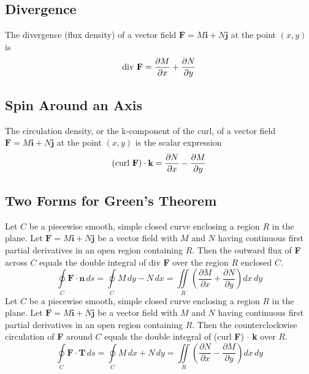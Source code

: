 \documentclass{article}
\begin{document}
\subsection*{Divergence}
The divergence (flux density) of a vector field \(\textbf{F}=M\textbf{i}+N\textbf{j}\) at the point \((x,y)\) is
\[\textnormal{div }\textbf{F}=\frac{\partial M}{\partial x}+\frac{\partial N}{\partial y}\]
\subsection*{Spin Around an Axis}
The circulation density, or the k-component of the curl, of a vector field \(\textbf{F}=M\textbf{i}+N\textbf{j}\) at the point \((x,y)\) is the scalar expression
\[(\textnormal{curl }\textbf{F})\cdot \textbf{k}=\frac{\partial N}{\partial x}-\frac{\partial M}{\partial y}\]
\subsection*{Two Forms for Green's Theorem}
Let \(C\) be a piecewise smooth, simple closed curve enclosing a region \(R\) in the plane. Let \(\textbf{F}=M\textbf{i}+N\textbf{j}\) be a vector field with \(M\) and \(N\) having continuous first partial derivatives in an open region containing \(R\). Then the outward flux of \textbf{F} across \(C\) equals the double integral of div \textbf{F} over the region \(R\) enclosed \(C\).
\[\oint\limits_C\textbf{F}\cdot\textbf{n}\,ds=\oint\limits_CM\,dy-N\,dx=\iint\limits_R\left(\frac{\partial M}{\partial x}+\frac{\partial N}{\partial y}\right)dx\,dy\]
Let \(C\) be a piecewise smooth, simple closed curve enclosing a region \(R\) in the plane. Let \(\textbf{F}=M\textbf{i}+N\textbf{j}\) be a vector field with \(M\) and \(N\) having continuous first partial derivatives in an open region containing \(R\). Then the counterclockwise circulation of \textbf{F} around \(C\) equals the double integral of (curl \textbf{F}) \(\cdot\) \textbf{k} over \(R\).
\[\oint\limits_C\textbf{F}\cdot\textbf{T}\,ds=\oint\limits_CM\,dx+N\,dy=\iint\limits_R\left(\frac{\partial N}{\partial x}-\frac{\partial M}{\partial y}\right)dx\,dy\]
\end{document}
